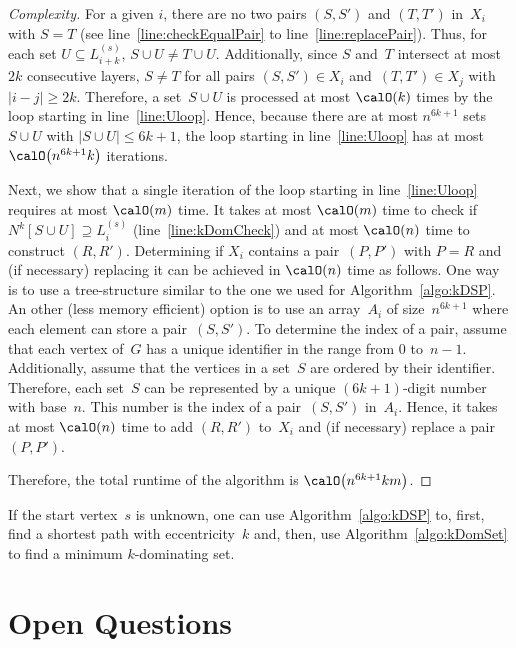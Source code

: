 \begin{proof}
    [Complexity]
%
For a given $i$, there are no two pairs $(S, S')$ and $(T, T')$ in~$X_i$ with $S = T$ (see line~\ref{line:checkEqualPair} to line~\ref{line:replacePair}).
Thus, for each set $U \subseteq L_{i+k}^{(s)}$, $S \cup U \neq T \cup U$.
Additionally, since $S$ and~$T$ intersect at most~$2k$ consecutive layers, $S \neq T$ for all pairs $(S, S') \in X_i$ and~$(T, T') \in X_j$ with $|i - j| \geq 2k$.
Therefore, a set~$S \cup U$ is processed at most $\calO(k)$ times by the loop starting in line~\ref{line:Uloop}.
Hence, because there are at most $n^{6k+1}$ sets~$S \cup U$ with $|S \cup U| \leq 6k + 1$, the loop starting in line~\ref{line:Uloop} has at most $\calO \big( n^{6k+1} k \big)$ iterations.

Next, we show that a single iteration of the loop starting in line~\ref{line:Uloop} requires at most $\calO(m)$ time.
It takes at most $\calO(m)$ time to check if $N^k[S \cup U] \supseteq L_{i}^{(s)}$ (line~\ref{line:kDomCheck}) and at most $\calO(n)$ time to construct $(R, R')$.
Determining if $X_i$ contains a pair~$(P, P')$ with $P = R$ and (if necessary) replacing it can be achieved in $\calO(n)$ time as follows.
One way is to use a tree-structure similar to the one we used for Algorithm~\ref{algo:kDSP}.
An other (less memory efficient) option is to use an array~$A_i$ of size~$n^{6k + 1}$ where each element can store a pair~$(S, S')$.
To determine the index of a pair, assume that each vertex of~$G$ has a unique identifier in the range from $0$ to~$n-1$.
Additionally, assume that the vertices in a set~$S$ are ordered by their identifier.
Therefore, each set~$S$ can be represented by a unique $(6k+1)$-digit number with base~$n$.
This number is the index of a pair~$(S, S')$ in~$A_i$.
Hence, it takes at most $\calO(n)$ time to add $(R, R')$ to~$X_i$ and (if necessary) replace a pair~$(P, P')$.

Therefore, the total runtime of the algorithm is $\calO \big( n^{6k+1} km \big)$.
\end{proof}

If the start vertex~$s$ is unknown, one can use Algorithm~\ref{algo:kDSP} to, first, find a shortest path with eccentricity~$k$ and, then, use Algorithm~\ref{algo:kDomSet} to find a minimum $k$-dominating set.

\section{Open Questions}

